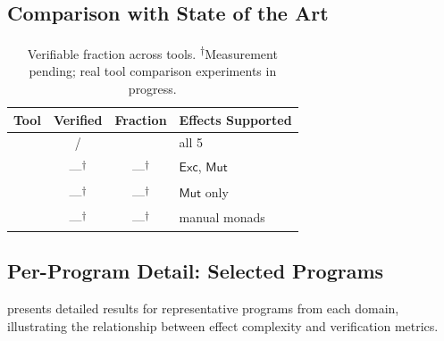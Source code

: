 \documentclass[11pt]{article}
\newcommand{\Exc}{\mathsf{Exc}}          %
\newcommand{\Mut}{\mathsf{Mut}}          %
\begin{document}
\subsection{Comparison with State of the Art}

\begin{table}[H]
\centering
\caption{Verifiable fraction across tools.
  \textsuperscript{$\dagger$}Measurement pending; real tool comparison experiments in progress.}\label{tab:verifiable}
\begin{tabular}{@{}l c c l@{}}
\toprule
\textbf{Tool} & \textbf{Verified} & \textbf{Fraction}
  & \textbf{Effects Supported} \\
\midrule
\JuGeo{}    & \expVerified{}/\expTotalPrograms{} & \expAccuracy{}
  & all 5 \\
\Fstar{}    & ---\textsuperscript{$\dagger$} & ---\textsuperscript{$\dagger$}
  & $\Exc$, $\Mut$ \\
\Dafny{}    & ---\textsuperscript{$\dagger$} & ---\textsuperscript{$\dagger$}
  & $\Mut$ only \\
\LEAN{}     & ---\textsuperscript{$\dagger$} & ---\textsuperscript{$\dagger$}
  & manual monads \\
\bottomrule
\end{tabular}
\end{table}

\subsection{Per-Program Detail: Selected Programs}

 presents detailed results for representative
programs from each domain, illustrating the relationship between
effect complexity and verification metrics.
\end{document}
